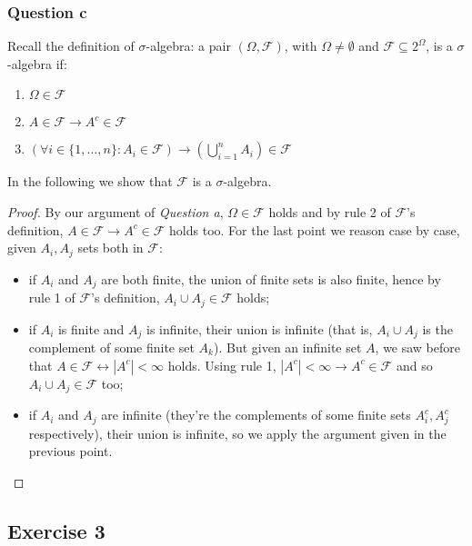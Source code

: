 \documentclass[twoside,openright,titlepage,fleqn,
	headinclude,11pt,a4paper,BCOR5mm,footinclude
	]{scrbook}
\begin{document}
\subsubsection{Question c}
Recall the definition of $\sigma$-algebra: a pair $(\Omega,
\mathcal{F})$, with $\Omega \not = \emptyset$ and $\mathcal{F}
\subseteq 2^\Omega$, is a $\sigma$-algebra if:
\begin{enumerate}
\item $\Omega \in \mathcal{F}$
\item $A \in \mathcal{F} \rightarrow A^c \in \mathcal{F}$
\item $\left( \forall i\in\{1,\ldots, n\}: A_i \in \mathcal{F} \right)
  \rightarrow \left(\bigcup_{i=1}^{n} A_i \right ) \in \mathcal{F}$
\end{enumerate}
In the following we show that $\mathcal{F}$ is a $\sigma$-algebra.
\begin{proof}
  By our argument of \emph{Question a}, $\Omega \in \mathcal{F}$ holds
  and by rule 2 of $\mathcal{F}$'s definition, $A \in \mathcal{F}
  \rightarrow A^c \in \mathcal{F}$ holds too. For the last point we
  reason case by case, given $A_i, A_j$ sets both in $\mathcal{F}$:
  \begin{itemize}
  \item if $A_i$ and $A_j$ are both finite, the union of finite sets
    is also finite, hence by rule 1 of $\mathcal{F}$'s definition,
    $A_i \cup A_j \in \mathcal{F}$ holds;
  \item if $A_i$ is finite and $A_j$ is infinite, their union is
    infinite (that is, $A_i \cup A_j$ is the complement of some finite
    set $A_k$). But given an infinite set $A$, we saw before that $A
    \in \mathcal{F} \leftrightarrow |A^c| < \infty$ holds. Using rule
    1, $|A^c| < \infty \rightarrow A^c \in \mathcal{F}$ and so $A_i
    \cup A_j \in \mathcal{F}$ too;
  \item if $A_i$ and $A_j$ are infinite (they're the complements of
    some finite sets $A_i^c, A_j^c$ respectively), their union is
    infinite, so we apply the argument given in the previous point.
  \end{itemize}
\end{proof}

\subsection{Exercise 3}
\end{document}
